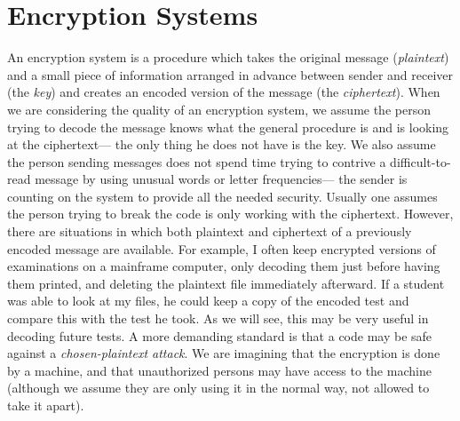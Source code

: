 \section{Encryption Systems}
An encryption system is a procedure which takes the original message
({\it plaintext\/}) and a small piece of information arranged in advance
between sender and receiver (the {\it key\/}) and creates an encoded
version of the message (the {\it ciphertext\/}).
\pq When we are considering the quality of an encryption system, we assume
the person trying to decode the message knows what the general pro\-cedure
is and is looking at the ciphertext--- the only thing he does not have
is the key.  We also assume the person sending messages does not spend
time trying to contrive a difficult-to-read message by using unusual
words or letter frequencies--- the sender is counting on the system to
provide all the needed security.
\pq Usually one assumes the person trying to break the code is only
working with the ciphertext.  However, there are situations in which
both plaintext and ciphertext of a previously encoded message are 
available.  For example, I often keep encrypted versions of examinations
on a mainframe computer, only decoding them just before having them
printed, and deleting the plaintext file immediately afterward.  If a
student was able to look at my files, he could keep a copy of the
encoded test and compare this with the test he took.  As we will see,
this may be very useful in decoding future tests.
\pq A more demanding standard is that a code may be safe against a
{\it chosen-plaintext attack}.  We are imagining that the encryption is
done by a machine, and that unauthorized persons may have access to
the machine (although we assume they are only using it in the normal
way, not allowed to take it apart).
